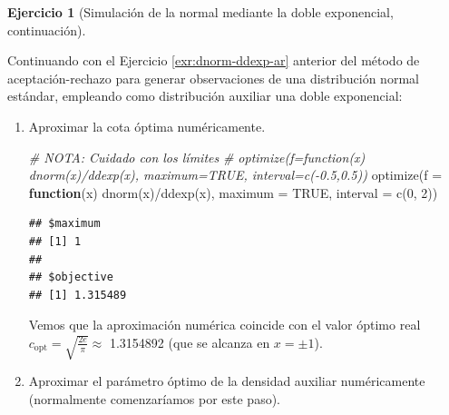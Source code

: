 \documentclass[
]{book}
\newenvironment{Shaded}{\begin{snugshade}}{\end{snugshade}}
\newcommand{\AttributeTok}[1]{\textcolor[rgb]{0.77,0.63,0.00}{#1}}
\newcommand{\CommentTok}[1]{\textcolor[rgb]{0.56,0.35,0.01}{\textit{#1}}}
\newcommand{\ConstantTok}[1]{\textcolor[rgb]{0.00,0.00,0.00}{#1}}
\newcommand{\ControlFlowTok}[1]{\textcolor[rgb]{0.13,0.29,0.53}{\textbf{#1}}}
\newcommand{\DecValTok}[1]{\textcolor[rgb]{0.00,0.00,0.81}{#1}}
\newcommand{\FunctionTok}[1]{\textcolor[rgb]{0.00,0.00,0.00}{#1}}
\newcommand{\NormalTok}[1]{#1}
\newcommand{\OtherTok}[1]{\textcolor[rgb]{0.56,0.35,0.01}{#1}}
\newcommand{\SpecialCharTok}[1]{\textcolor[rgb]{0.00,0.00,0.00}{#1}}
\theoremstyle{break}
\theoremstyle{definition}
\theoremstyle{definition}
\theoremstyle{definition}
\newtheorem{exercise}{Ejercicio}[chapter]
\theoremstyle{definition}
\theoremstyle{remark}
\begin{document}
\begin{exercise}[Simulación de la normal mediante la doble exponencial, continuación]
\protect\hypertarget{exr:dnorm-ddexp-arb}{}{\label{exr:dnorm-ddexp-arb} {} }
\end{exercise}

Continuando con el Ejercicio \ref{exr:dnorm-ddexp-ar} anterior del método de aceptación-rechazo para generar observaciones de una distribución normal estándar, empleando como distribución auxiliar una doble exponencial:

\begin{enumerate}
\def\labelenumi{\alph{enumi})}
\setcounter{enumi}{2}
\item
  Aproximar la cota óptima numéricamente.

\begin{Shaded}
\begin{Highlighting}[]
\CommentTok{\# NOTA: Cuidado con los límites}
\CommentTok{\# optimize(f=function(x) dnorm(x)/ddexp(x), maximum=TRUE, interval=c({-}0.5,0.5))}
\FunctionTok{optimize}\NormalTok{(}\AttributeTok{f =} \ControlFlowTok{function}\NormalTok{(x) }\FunctionTok{dnorm}\NormalTok{(x)}\SpecialCharTok{/}\FunctionTok{ddexp}\NormalTok{(x), }\AttributeTok{maximum =} \ConstantTok{TRUE}\NormalTok{, }\AttributeTok{interval =} \FunctionTok{c}\NormalTok{(}\DecValTok{0}\NormalTok{, }\DecValTok{2}\NormalTok{))}
\end{Highlighting}
\end{Shaded}

\begin{verbatim}
## $maximum
## [1] 1
## 
## $objective
## [1] 1.315489
\end{verbatim}

  Vemos que la aproximación numérica coincide con el valor óptimo real \(c_{\text{opt}}=\sqrt{\frac{2e}{\pi}} \approx\) 1.3154892 (que se alcanza en \(x = \pm 1\)).
\item
  Aproximar el parámetro óptimo de la densidad auxiliar
  numéricamente (normalmente comenzaríamos por este paso).

\begin{Shaded}
\end{Shaded}
\end{enumerate}
\end{document}
